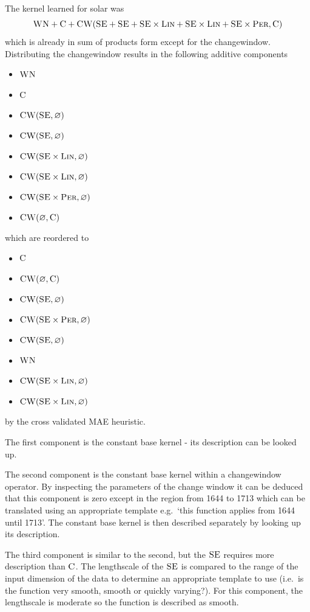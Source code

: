 \documentclass{article}
\def\ie{i.e.\ }
\def\eg{e.g.\ }
\let\emptyset\varnothing
\begin{document}
The kernel learned for solar was
\begin{equation}
{\textsc{WN}} + {\textsc{C}} + {\textsc{CW}}({\textsc{SE}} + {\textsc{SE}} + {\textsc{SE}} \times {\textsc{Lin}}  + {\textsc{SE}} \times {\textsc{Lin}} + {\textsc{SE}} \times {\textsc{Per}}, {\textsc{C}})
\end{equation}
which is already in sum of products form except for the changewindow.
Distributing the changewindow results in the following additive components
\begin{itemize}
  \itemsep0em
  \item ${\textsc{WN}}$
  \item ${\textsc{C}}$
  \item $\kCW(\kSE, \emptyset)$
  \item $\kCW(\kSE, \emptyset)$
  \item $\kCW(\kSE \times \kLin, \emptyset)$
  \item $\kCW(\kSE \times \kLin, \emptyset)$
  \item $\kCW(\kSE \times \kPer, \emptyset)$
  \item $\kCW(\emptyset, \kC)$
\end{itemize}
which are reordered to
\begin{itemize}
  \itemsep0em
  \item ${\textsc{C}}$
  \item $\kCW(\emptyset, \kC)$
  \item $\kCW(\kSE, \emptyset)$
  \item $\kCW(\kSE \times \kPer, \emptyset)$
  \item $\kCW(\kSE, \emptyset)$
  \item ${\textsc{WN}}$
  \item $\kCW(\kSE \times \kLin, \emptyset)$
  \item $\kCW(\kSE \times \kLin, \emptyset)$
\end{itemize}
by the cross validated MAE heuristic.

The first component is the constant base kernel - its description can be looked up.

The second component is the constant base kernel within a changewindow operator.
By inspecting the parameters of the change window it can be deduced that this component is zero except in the region from 1644 to 1713 which can be translated using an appropriate template \eg `this function applies from 1644 until 1713'.
The constant base kernel is then described separately by looking up its description.

The third component is similar to the second, but the ${\textsc{SE}}$ requires more description than ${\textsc{C}}$.
The lengthscale of the ${\textsc{SE}}$ is compared to the range of the input dimension of the data to determine an appropriate template to use (\ie is the function very smooth, smooth or quickly varying?).
For this component, the lengthscale is moderate so the function is described as smooth.
\end{document}
